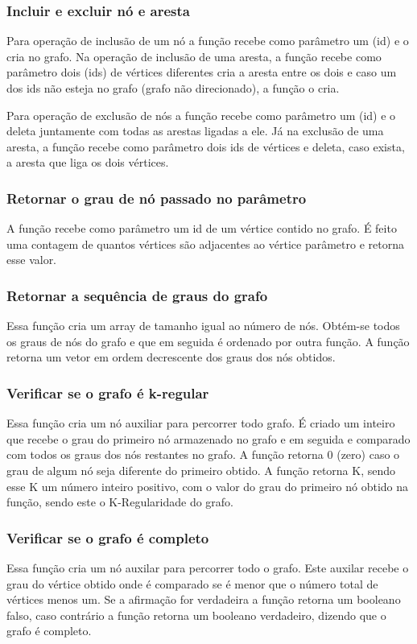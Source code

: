 \documentclass[a4paper, 12pt]{article}
\begin{document}
\subsubsection{Incluir e excluir nó e aresta}
Para  operação de inclusão de um nó a função recebe como parâmetro um (id) e o cria no grafo. Na operação de inclusão de uma aresta, a função recebe como parâmetro dois (ids) de vértices diferentes cria a aresta entre os dois e caso um dos ids não esteja no grafo (grafo não direcionado), a função o cria.

Para operação de exclusão de nós a função recebe como parâmetro um (id) e o deleta juntamente com todas as arestas ligadas a ele. Já na exclusão de uma aresta, a função recebe como parâmetro dois ids de vértices e deleta, caso exista, a aresta que liga os dois vértices.

\subsubsection{Retornar o grau de nó passado no parâmetro}

A função recebe como parâmetro um id de um vértice contido no grafo. É feito uma contagem de quantos vértices são adjacentes ao vértice parâmetro e retorna esse valor.

\subsubsection{Retornar a sequência de graus do grafo}
Essa função cria um array de tamanho igual ao número de nós. Obtém-se todos os graus de nós do grafo e que em seguida é ordenado por outra função. A função retorna um vetor em ordem decrescente dos graus dos nós obtidos.

\subsubsection{Verificar se  o grafo é k-regular}
Essa função cria um nó auxiliar para percorrer todo grafo. É criado um inteiro que recebe o grau do primeiro nó armazenado no grafo e em seguida e comparado com todos os graus dos nós restantes no grafo. A função retorna 0 (zero) caso o grau de algum nó seja diferente do primeiro obtido. A função retorna K, sendo esse K um número inteiro positivo, com o valor do grau do primeiro nó obtido na função, sendo este o K-Regularidade do grafo.

\subsubsection{Verificar se o grafo é completo}
Essa função cria um nó auxilar para percorrer todo o grafo. Este auxilar recebe o grau do vértice obtido onde é comparado se é menor que o número total de vértices menos um. Se a afirmação for verdadeira a função retorna um booleano falso, caso contrário a função retorna um booleano verdadeiro, dizendo que o grafo é completo.
\end{document}
